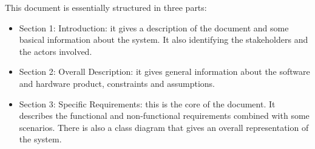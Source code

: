 This document is essentially structured in three parts:
\begin{itemize}
\item Section 1: Introduction: it gives a description of the  document and some basical information about the system. It also identifying the stakeholders and the actors involved.
\item Section 2: Overall Description: it gives general information about the software and hardware product, constraints and assumptions.
\item Section 3: Specific Requirements: this is the core of the document. It describes the functional and non-functional requirements combined with some scenarios. There is also a class diagram that gives an overall representation of the system.
\end{itemize}